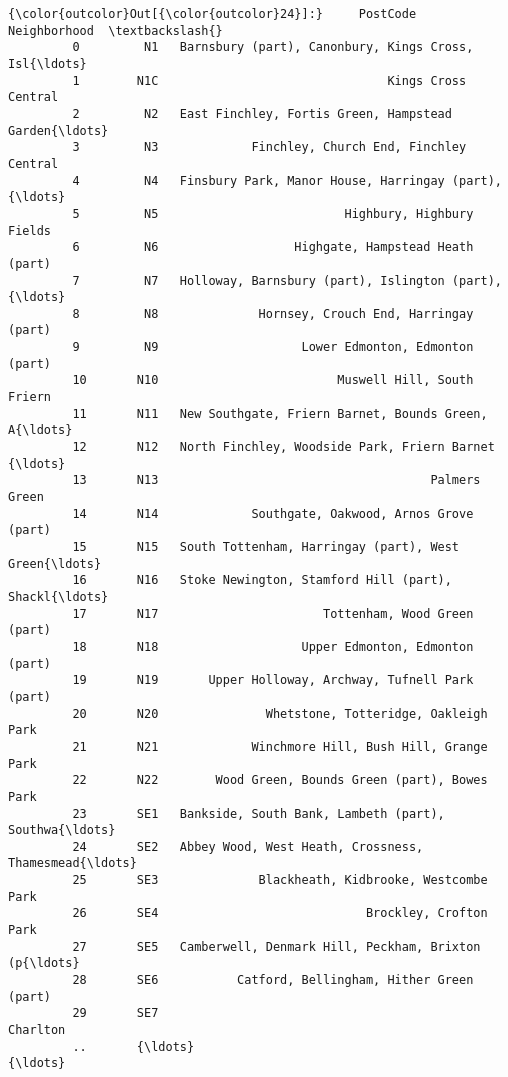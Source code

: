 \documentclass[11pt]{article}
\begin{document}
\begin{Verbatim}[commandchars=\\\{\}]
{\color{outcolor}Out[{\color{outcolor}24}]:}     PostCode                                       Neighborhood  \textbackslash{}
         0         N1   Barnsbury (part), Canonbury, Kings Cross, Isl{\ldots}   
         1        N1C                                Kings Cross Central   
         2         N2   East Finchley, Fortis Green, Hampstead Garden{\ldots}   
         3         N3             Finchley, Church End, Finchley Central   
         4         N4   Finsbury Park, Manor House, Harringay (part),{\ldots}   
         5         N5                          Highbury, Highbury Fields   
         6         N6                   Highgate, Hampstead Heath (part)   
         7         N7   Holloway, Barnsbury (part), Islington (part),{\ldots}   
         8         N8              Hornsey, Crouch End, Harringay (part)   
         9         N9                    Lower Edmonton, Edmonton (part)   
         10       N10                         Muswell Hill, South Friern   
         11       N11   New Southgate, Friern Barnet, Bounds Green, A{\ldots}   
         12       N12   North Finchley, Woodside Park, Friern Barnet {\ldots}   
         13       N13                                      Palmers Green   
         14       N14             Southgate, Oakwood, Arnos Grove (part)   
         15       N15   South Tottenham, Harringay (part), West Green{\ldots}   
         16       N16   Stoke Newington, Stamford Hill (part), Shackl{\ldots}   
         17       N17                       Tottenham, Wood Green (part)   
         18       N18                    Upper Edmonton, Edmonton (part)   
         19       N19       Upper Holloway, Archway, Tufnell Park (part)   
         20       N20               Whetstone, Totteridge, Oakleigh Park   
         21       N21             Winchmore Hill, Bush Hill, Grange Park   
         22       N22        Wood Green, Bounds Green (part), Bowes Park   
         23       SE1   Bankside, South Bank, Lambeth (part), Southwa{\ldots}   
         24       SE2   Abbey Wood, West Heath, Crossness, Thamesmead{\ldots}   
         25       SE3              Blackheath, Kidbrooke, Westcombe Park   
         26       SE4                             Brockley, Crofton Park   
         27       SE5   Camberwell, Denmark Hill, Peckham, Brixton (p{\ldots}   
         28       SE6           Catford, Bellingham, Hither Green (part)   
         29       SE7                                           Charlton   
         ..       {\ldots}                                                {\ldots}   

\end{Verbatim}
\end{document}
